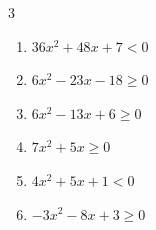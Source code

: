 \begin{multicols}{3}
\begin{enumerate}
  \item $36x^{2}+48x+7<0$


  \item $6x^{2}-23x-18\geq 0$


  \item $6x^{2}-13x+6\geq 0$


  \item $7x^{2}+5x\geq 0$


  \item $4x^{2}+5x+1<0$


  \item $-3x^{2}-8x+3\geq 0$


\end{enumerate}
\end{multicols}

\newpage
\resetdrill

